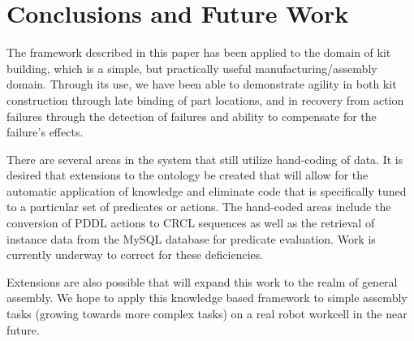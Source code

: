 \section{Conclusions and Future Work}
\label{sect:future}
The framework described in this paper has been applied to the domain of kit building, which is a simple, but practically useful manufacturing/assembly domain. Through its use, we have been able to demonstrate agility in both kit construction through late binding of part locations, and in recovery from action failures through the detection of failures and ability to compensate for the failure's effects.

There are several areas in the system that still utilize hand-coding of data. It is desired that extensions to the ontology be created that will allow for the automatic application of knowledge and eliminate code that is specifically tuned to a particular set of predicates or actions. The hand-coded areas include the conversion of PDDL actions to CRCL sequences as well as the retrieval of instance data from the MySQL database for predicate evaluation. Work is currently underway to correct for these deficiencies. 

Extensions are also possible that will expand this work to the realm of general assembly. We hope to apply this knowledge based framework to simple assembly tasks (growing towards more complex tasks) on a real robot workcell in the near future. 
